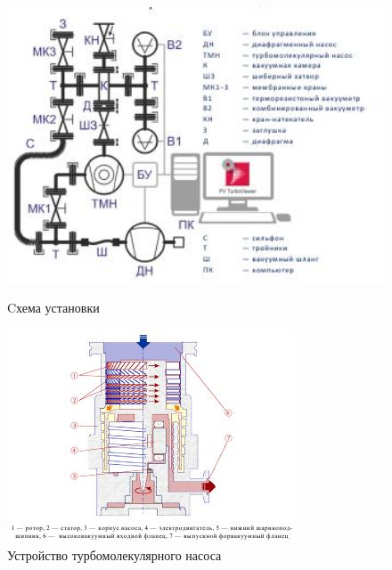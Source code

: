 \documentclass[12pt,a4paper]{article}
\begin{document}
	\begin{figure}[h!]
		\begin{center}
			\begin{minipage}[h]{0.4\linewidth}
				\includegraphics[width = 1.3\textwidth]{scem_of_facility}
				\caption{Cхема установки}
				\label{fig:scem_of_facility}
			\end{minipage}
		\hfill
			\begin{minipage}[h]{0.4\linewidth}
				\includegraphics[width=1.25\linewidth]{Turbomolecular_pump_schem}
				\caption{Устройство турбомолекулярного насоса}
				\label{fig:Turbomolecular_pump_schem}
			\end{minipage}
		\end{center}
	\end{figure}
	
\end{document}
